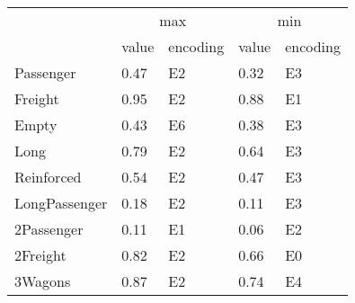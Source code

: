 \begin{tabular}{lllll}
\toprule
 & \multicolumn{2}{c}{max} & \multicolumn{2}{c}{min} \\
 & value & encoding & value & encoding \\
\midrule
Passenger & 0.47 & E2 & 0.32 & E3 \\
Freight & 0.95 & E2 & 0.88 & E1 \\
Empty & 0.43 & E6 & 0.38 & E3 \\
Long & 0.79 & E2 & 0.64 & E3 \\
Reinforced & 0.54 & E2 & 0.47 & E3 \\
LongPassenger & 0.18 & E2 & 0.11 & E3 \\
2Passenger & 0.11 & E1 & 0.06 & E2 \\
2Freight & 0.82 & E2 & 0.66 & E0 \\
3Wagons & 0.87 & E2 & 0.74 & E4 \\
\bottomrule
\end{tabular}
